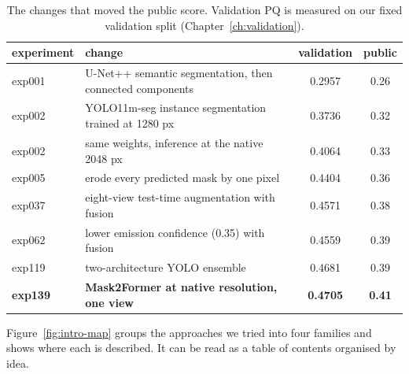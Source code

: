 \begin{table}[t]
\centering\small
\caption{The changes that moved the public score. Validation PQ is measured on our fixed
validation split (Chapter~\ref{ch:validation}).}
\label{tab:intro-milestones}
\begin{tabularx}{\textwidth}{@{}lXcc@{}}
\toprule
experiment & change & validation & public \\
\midrule
exp001 & U-Net++ semantic segmentation, then connected components & 0.2957 & 0.26 \\
exp002 & YOLO11m-seg instance segmentation trained at 1280 px & 0.3736 & 0.32 \\
exp002 & same weights, inference at the native 2048 px & 0.4064 & 0.33 \\
exp005 & erode every predicted mask by one pixel & 0.4404 & 0.36 \\
exp037 & eight-view test-time augmentation with fusion & 0.4571 & 0.38 \\
exp062 & lower emission confidence (0.35) with fusion & 0.4559 & 0.39 \\
exp119 & two-architecture YOLO ensemble & 0.4681 & 0.39 \\
\textbf{exp139} & \textbf{Mask2Former at native resolution, one view} & \textbf{0.4705} & \textbf{0.41} \\
\bottomrule
\end{tabularx}
\end{table}

Figure~\ref{fig:intro-map} groups the approaches we tried into four families and shows where
each is described. It can be read as a table of contents organised by idea.

